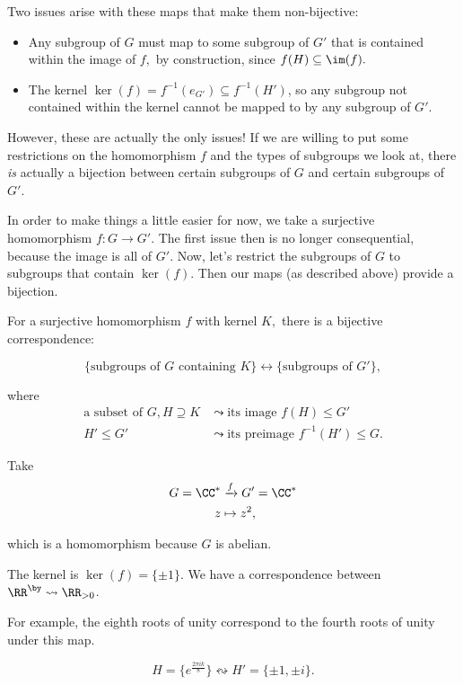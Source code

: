 Two issues arise with these maps that make them non-bijective:
\begin{itemize}
    \item Any subgroup of $G$ must map to some subgroup of $G'$ that is contained within the image of $f,$ by construction, since $f(H) \subseteq \im(f).$ 
    \item The kernel $\ker(f) = f^{-1}(e_{G'}) \subseteq f^{-1}(H')$, so any subgroup not contained within the kernel cannot be mapped to by any subgroup of $G'.$
\end{itemize}

However, these are actually the only issues! If we are willing to put some restrictions on the homomorphism $f$ and the types of subgroups we look at, there \emph{is} actually a bijection between certain subgroups of $G$ and certain subgroups of $G'$.

In order to make things a little easier for now, we take a surjective homomorphism
$f: G \rightarrow G'$. The first issue then is no longer consequential, because the image is all of $G'$. Now, let's restrict the subgroups of $G$ to subgroups that contain $\ker(f).$ Then our maps (as described above) provide a bijection. 

\begin{theorem}
For a surjective homomorphism $f$ with kernel $K,$ there is a bijective correspondence:

\[\{\text{subgroups of } G \text{ containing } K\} \leftrightarrow \{\text{subgroups of } G'\},\] 

where 
\begin{align*}
    \text{a subset of }G, H \supseteq K &\leadsto \text{its image } f(H) \leq G' \\
    H' \leq G' &\leadsto \text{its preimage } f^{-1}(H') \leq G.
\end{align*}
\end{theorem}


\begin{example}
Take
\begin{align*}
G = \CC^{*} &\xrightarrow{f} G' = \CC^{*}  \\
z &\mapsto z^2,
\end{align*}

which is a homomorphism because $G$ is abelian.

The kernel is $\ker(f) = \{\pm 1\}.$ We have a correspondence between $\RR^{\by} \leadsto \RR_{>0}$. 

For example, the eighth roots of unity correspond to the fourth roots of unity under this map. 

\[H = \{e^{\frac{2\pi ik}{8}}\} \leftrightsquigarrow H' = \{\pm 1, \pm i\}.\]
\end{example}

